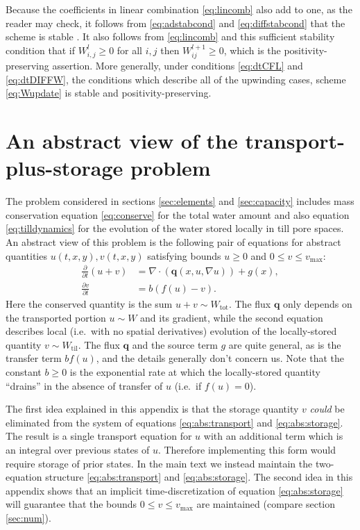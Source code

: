 \documentclass[11pt,final]{amsart}
\newcommand{\Div}{\nabla\cdot}
\newcommand{\grad}{\nabla}
\newcommand{\Wtil}{W_{\text{til}}}
\newcommand{\Wtot}{W_{\text{tot}}}
\newcommand{\Wlij}{W^l_{i,j}}
\begin{document}
Because the coefficients in linear combination \eqref{eq:lincomb} also add to one, as the reader may check, it follows  from \eqref{eq:adstabcond} and \eqref{eq:diffstabcond} that the scheme is stable \citep{MortonMayers}.  It also follows from \eqref{eq:lincomb} and this sufficient stability condition that if $\Wlij\ge 0$ for all $i,j$ then $W_{ij}^{l+1}\ge 0$, which is the positivity-preserving assertion.  More generally, under conditions \eqref{eq:dtCFL} and \eqref{eq:dtDIFFW}, the conditions which describe all of the upwinding cases, scheme \eqref{eq:Wupdate} is stable and positivity-preserving.


\section{An abstract view of the transport-plus-storage problem} \label{app:transportstorage}

The problem considered in sections \ref{sec:elements} and \ref{sec:capacity} includes mass conservation equation \eqref{eq:conserve} for the total water amount and also equation \eqref{eq:tilldynamics} for the evolution of the water stored locally in till pore spaces.  An abstract view of this problem is the following pair of equations for abstract quantities $u(t,x,y),v(t,x,y)$ satisfying bounds $u\ge 0$ and $0 \le v \le v_{\text{max}}$:
\begin{align}
\frac{\partial}{\partial t} \left(u+v\right) &= \Div \left(\mathbf{q}(x,u,\grad u)\right) + g(x), \label{eq:abs:transport} \\
   \frac{\partial v}{\partial t} &= b \left(f(u) - v\right).  \label{eq:abs:storage}
\end{align}
Here the conserved quantity is the sum $u+v \sim \Wtot$.  The flux $\mathbf{q}$ only depends on the transported portion $u \sim W$ and its gradient, while the second equation describes local (i.e.~with no spatial derivatives) evolution of the locally-stored quantity $v \sim \Wtil$.  The flux $\mathbf{q}$ and the source term $g$ are quite general, as is the transfer term $b f(u)$, and the details generally don't concern us.  Note that the constant $b\ge 0$ is the exponential rate at which the locally-stored quantity ``drains'' in the absence of transfer of $u$ (i.e.~if $f(u)=0$).

The first idea explained in this appendix is that the storage quantity $v$ \emph{could} be eliminated from the system of equations \eqref{eq:abs:transport} and \eqref{eq:abs:storage}.  The result is a single transport equation for $u$ with an additional term which is an integral over previous states of $u$.  Therefore implementing this form would require storage of prior states.  In the main text we instead maintain the two-equation structure  \eqref{eq:abs:transport} and \eqref{eq:abs:storage}.  The second idea in this appendix shows that an implicit time-discretization of equation \eqref{eq:abs:storage} will guarantee that the bounds $0 \le v \le v_{\text{max}}$ are maintained (compare section \ref{sec:num}).   
\end{document}
